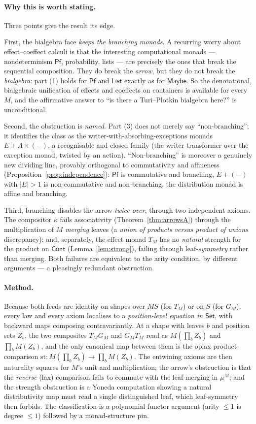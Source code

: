 \documentclass[11pt]{amsart}
\theoremstyle{plain}
\theoremstyle{definition}
\theoremstyle{remark}
\newcommand{\Set}{\mathsf{Set}}
\newcommand{\Cont}{\mathsf{Cont}}
\newcommand{\str}{\mathrm{st}}
\newcommand{\Maybe}{\mathsf{Maybe}}
\newcommand{\Pf}{\mathsf{Pf}}
\newcommand{\List}{\mathsf{List}}
\begin{document}
\paragraph{Why this is worth stating.}
Three points give the result its edge.

First, the bialgebra face \emph{keeps the branching monads}. A recurring worry about
effect--coeffect calculi is that the interesting computational monads --- nondeterminism
$\Pf$, probability, lists --- are precisely the ones that break the sequential composition.
They do break the \emph{arrow}, but they do not break the \emph{bialgebra}: part (1) holds
for $\Pf$ and $\List$ exactly as for $\Maybe$. So the denotational, bialgebraic unification
of effects and coeffects on containers is available for every $M$, and the affirmative
answer to ``is there a Turi--Plotkin bialgebra here?'' is unconditional.

Second, the obstruction is \emph{named}. Part (3) does not merely say ``non-branching''; it
identifies the class as the writer-with-absorbing-exceptions monads $E + A\times(-)$, a
recognisable and closed family (the writer transformer over the exception monad, twisted by
an action). ``Non-branching'' is moreover a genuinely new dividing line, provably orthogonal to
commutativity and affineness (Proposition~\ref{prop:independence}): $\Pf$ is commutative and branching,
$E+(-)$ with $|E|>1$ is non-commutative and non-branching, the distribution monad is affine
and branching.

Third, branching disables the arrow \emph{twice over}, through two independent axioms. The
compositor $\kappa$ fails associativity (Theorem~\ref{thm:arrowsA}) through the
multiplication of $M$ \emph{merging} leaves (a \emph{union of products versus product of
unions} discrepancy); and, separately, the effect monad $T_M$ has no \emph{natural} strength
for the product on $\Cont$ (Lemma~\ref{lem:strong}), failing through leaf-\emph{symmetry}
rather than merging. Both failures are equivalent to the arity condition, by different
arguments --- a pleasingly redundant obstruction.

\paragraph{Method.}
Because both feeds are identity on shapes over $MS$ (for $T_M$) or on $S$ (for $G_M$), every
law and every axiom localises to a \emph{position-level equation in $\Set$}, with backward
maps composing contravariantly. At a shape with leaves $b$ and position sets $Z_b$, the two
composites $T_M G_M$ and $G_M T_M$ read as $M(\prod_b Z_b)$ and $\prod_b M(Z_b)$, and the
only canonical map between them is the oplax product-comparison
$\str\colon M(\prod_b Z_b)\to\prod_b M(Z_b)$. The entwining axioms are then naturality
squares for $M$'s unit and multiplication; the arrow's obstruction is that the \emph{reverse}
(lax) comparison fails to commute with the leaf-merging in $\mu^M$; and the strength
obstruction is a Yoneda computation showing a natural distributivity map must read a single
distinguished leaf, which leaf-symmetry then forbids. The classification is a
polynomial-functor argument (arity $\le 1$ is degree $\le 1$) followed by a monad-structure
pin.
\end{document}
